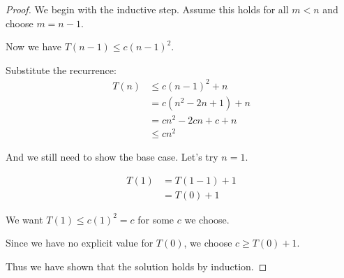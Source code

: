 \documentclass[12pt,letterpaper]{article}
\begin{document}
\begin{enumerate}
\begin{enumerate}
\begin{enumerate}
              \begin{proof} We begin with the inductive step.
                Assume this holds for all $m < n$ and choose $m = n - 1$.

                Now we have $T(n-1) \le c(n-1)^2$.

                Substitute the recurrence:
                \begin{align*}
                  T(n) &\le c(n-1)^2 + n \\
                  &= c(n^2-2n+1) + n \\
                  &= cn^2 - 2cn + c + n \\
                  &\le cn^2
                \end{align*}

                And we still need to show the base case.
                Let's try $n = 1$.

                \begin{align*}
                  T(1) &= T(1 - 1) + 1 \\
                  &= T(0) + 1
                \end{align*}

                We want $T(1) \le c(1)^2 = c$ for some $c$ we choose.

                Since we have no explicit value for $T(0)$,
                we choose $c \ge T(0) + 1$.

                Thus we have shown that the solution holds by induction.
              \end{proof}
          \end{enumerate}
      \end{enumerate}
  \end{enumerate}
\end{document}
